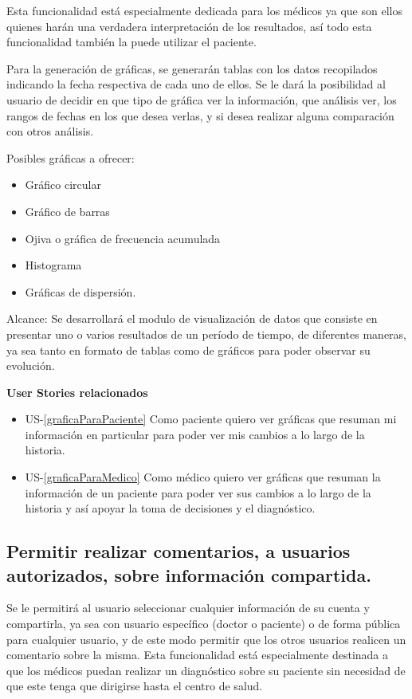 	Esta funcionalidad está especialmente dedicada para los médicos ya que son ellos quienes harán una verdadera interpretación de los resultados, así todo esta funcionalidad también la puede utilizar el paciente.
    
	Para la generación de gráficas, se generarán tablas con los datos recopilados indicando la fecha respectiva de cada uno de ellos.
	Se le dará la posibilidad al usuario de decidir en que tipo de gráfica ver la información, que análisis ver, los rangos de fechas en los que desea verlas, y si desea realizar alguna comparación con otros análisis.

	Posibles gráficas a ofrecer:
	\begin{itemize}
   		\item Gráfico circular
	   \item Gráfico de barras
	   \item Ojiva o gráfica de frecuencia acumulada
	   \item Histograma
	   \item Gráficas de dispersión.
	\end{itemize}
    
	Alcance: Se desarrollará el modulo de visualización de datos que consiste en presentar uno o varios resultados de un período de tiempo, de diferentes maneras, ya sea tanto en formato de tablas como de gráficos para poder observar su evolución. 

        
        
        \textbf{User Stories relacionados}
        \begin{itemize}
			\item US-\ref{graficaParaPaciente}  Como paciente quiero ver gráficas que resuman mi información en particular para poder ver mis cambios a lo largo de la historia.
			\item US-\ref{graficaParaMedico} Como médico quiero ver gráficas que resuman la información de un paciente para poder ver sus cambios a lo largo de la historia y así apoyar la toma de decisiones y el diagnóstico.
		\end{itemize}     
        
        
\subsection{Permitir realizar comentarios, a usuarios autorizados, sobre información compartida.}

    Se le permitirá al usuario seleccionar cualquier información de su cuenta y compartirla, ya sea con usuario específico (doctor o paciente) o de forma pública para cualquier usuario, y de este modo permitir que los otros usuarios realicen un comentario sobre la misma. Esta funcionalidad está especialmente destinada a que los médicos puedan realizar un diagnóstico sobre su paciente sin necesidad de que este tenga que dirigirse hasta el centro de salud.
    
